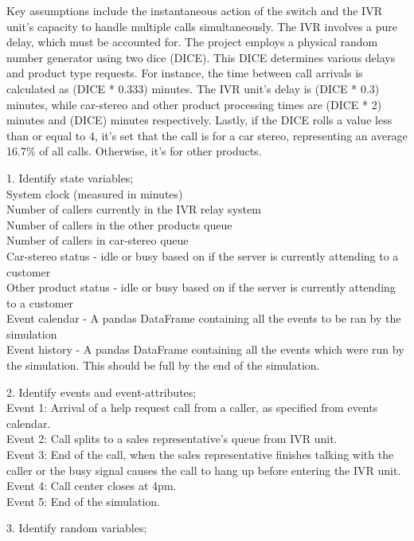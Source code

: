 \documentclass{article}
\begin{document}
Key assumptions include the instantaneous action of the switch and the IVR unit's capacity to handle multiple calls simultaneously. The IVR involves a pure delay, which must be accounted for. The project employs a physical random number generator using two dice (DICE). This DICE determines various delays and product type requests. For instance, the time between call arrivals is calculated as (DICE * 0.333) minutes. The IVR unit's delay is (DICE * 0.3) minutes, while car-stereo and other product processing times are (DICE * 2) minutes and (DICE) minutes respectively. Lastly, if the DICE rolls a value less than or equal to 4, it's set that the call is for a car stereo, representing an average 16.7\% of all calls. Otherwise, it's for other products. \\

\par
1. Identify state variables; \\ 
System clock (measured in minutes) \\
Number of callers currently in the IVR relay system \\
Number of callers in the other products queue \\
Number of callers in car-stereo queue \\
Car-stereo status - idle or busy based on if the server is currently attending to a customer \\
Other product status - idle or busy based on if the server is currently attending to a customer \\
Event calendar - A pandas DataFrame containing all the events to be ran by the simulation \\
Event history - A pandas DataFrame containing all the events which were run by the simulation. This should be full by the end of the simulation. \\

\par
2. Identify events and event-attributes; \\
Event 1: Arrival of a help request call from a caller, as specified from events calendar. \\
Event 2: Call splits to a sales representative’s queue from IVR unit. \\
Event 3: End of the call, when the sales representative finishes talking with the caller or the busy signal causes the call to hang up before entering the IVR unit. \\
Event 4: Call center closes at 4pm. \\
Event 5: End of the simulation.\\
\par
3. Identify random variables;
\end{document}
